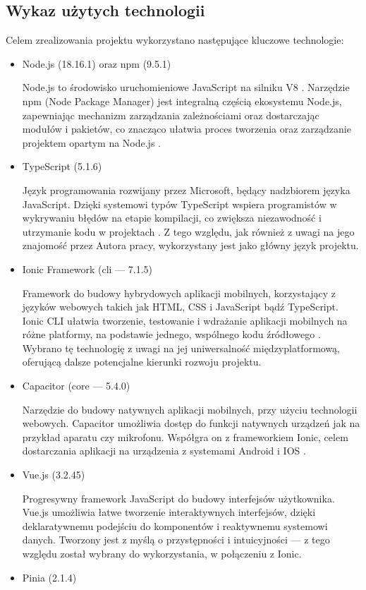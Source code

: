\subsection{Wykaz użytych technologii}
Celem zrealizowania projektu wykorzystano następujące kluczowe technologie:
\begin{itemize}
	\item Node.js (18.16.1) oraz npm (9.5.1)

	      Node.js to środowisko uruchomieniowe JavaScript na silniku V8 \cite{node}.
	      Narzędzie npm (Node Package Manager) jest integralną częścią ekosystemu Node.js,
	      zapewniając mechanizm zarządzania zależnościami oraz dostarczając modułów i pakietów,
	      co znacząco ułatwia proces tworzenia oraz zarządzanie projektem opartym na Node.js \cite{npm}.
	\item TypeScript (5.1.6)

	      Język programowania rozwijany przez Microsoft, będący nadzbiorem języka JavaScript.
	      Dzięki systemowi typów TypeScript wspiera programistów w wykrywaniu błędów na etapie kompilacji,
	      co zwiększa niezawodność i utrzymanie kodu w projektach \cite{ts}.
	      Z tego względu, jak również z uwagi na jego znajomość
	      przez Autora pracy, wykorzystany jest jako główny język projektu.
	\item Ionic Framework (cli — 7.1.5)

	      Framework do budowy hybrydowych aplikacji mobilnych, korzystający z języków webowych takich jak HTML,
	      CSS i JavaScript bądź TypeScript.
	      Ionic CLI ułatwia tworzenie, testowanie i wdrażanie aplikacji mobilnych na różne platformy, na podstawie jednego,
	      wspólnego kodu źródłowego \cite{ionic}.
	      Wybrano tę technologię z uwagi na jej uniwersalność międzyplatformową, oferującą dalsze potencjalne kierunki
	      rozwoju projektu.
	\item Capacitor (core — 5.4.0)

	      Narzędzie do budowy natywnych aplikacji mobilnych, przy użyciu technologii webowych.
	      Capacitor umożliwia dostęp do funkcji natywnych urządzeń jak na przykład aparatu czy mikrofonu.
	      Współgra on z frameworkiem Ionic, celem dostarczania aplikacji na urządzenia z systemami Android i IOS \cite{capacitor}.
	\item Vue.js (3.2.45)

	      Progresywny framework JavaScript do budowy interfejsów użytkownika.
	      Vue.js umożliwia łatwe tworzenie interaktywnych interfejsów, dzięki deklaratywnemu podejściu do komponentów i
	      reaktywnemu systemowi danych. Tworzony jest z myślą o przystępności i intuicyjności \cite{vue}
	      — z tego względu został wybrany do wykorzystania, w połączeniu z Ionic.
	\item Pinia (2.1.4)


\end{itemize}
